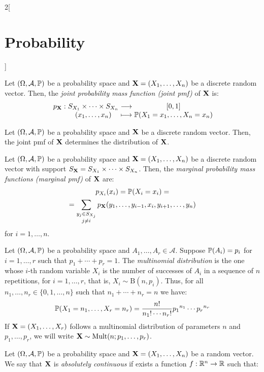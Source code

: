 \documentclass[../../../main.tex]{subfiles}
\begin{document}
\begin{multicols}{2}[\section{Probability}]
\begin{prop}
  \end{prop}
  \begin{definition}
    Let $(\Omega,\mathcal{A},\mathbb{P})$ be a probability space and $\boldsymbol{\mathrm{X}}=(X_1,\ldots,X_n)$ be a discrete random vector. Then, the \textit{joint probability mass function (joint pmf)} of $\boldsymbol{\mathrm{X}}$ is:
    $$
      \function{p_{\vf{X}}}{S_{X_1}\times\cdots\times S_{X_n}}{[0,1]}{(x_1,\ldots,x_n)}{\Prob(X_1=x_1,\ldots,X_n=x_n)}
    $$
  \end{definition}
  \begin{prop}
    Let $(\Omega,\mathcal{A},\mathbb{P})$ be a probability space and $\boldsymbol{\mathrm{X}}$ be a discrete random vector. Then, the joint pmf of $\boldsymbol{\mathrm{X}}$ determines the distribution of $\boldsymbol{\mathrm{X}}$.
  \end{prop}
  \begin{definition}
    Let $(\Omega,\mathcal{A},\mathbb{P})$ be a probability space and $\boldsymbol{\mathrm{X}}=(X_1,\ldots,X_n)$ be a discrete random vector with support $S_{\boldsymbol{\mathrm{X}}}=S_{X_1}\times\cdots\times S_{X_n}$. Then, the \textit{marginal probability mass functions (marginal pmf)} of $\boldsymbol{\mathrm{X}}$ are:
    \begin{multline*}
      p_{X_i}(x_i)=\mathbb{P}(X_i=x_i)=\\=\sum_{\substack{y_j\in S_{X_j}\\j\ne i}}p_{\boldsymbol{\mathrm{X}}}(y_1,\ldots,y_{i-1},x_i,y_{i+1},\ldots,y_n)
    \end{multline*}
    for $i=1,\ldots,n$.
  \end{definition}
  \begin{definition}
    Let $(\Omega,\mathcal{A},\mathbb{P})$ be a probability space and $A_1,\ldots,A_r\in\mathcal{A}$. Suppose $\mathbb{P}(A_i)=p_i$ for $i=1,\ldots,r$ such that $p_1+\cdots+p_r=1$. The \textit{multinomial distribution} is the one whose $i$-th random variable $X_i$ is the number of successes of $A_i$ in a sequence of $n$ repetitions, for $i=1,\ldots,r$, that is, $X_i\sim\text{B}(n,p_i)$. Thus, for all $n_1,\ldots,n_r\in\{0,1,\ldots,n\}$ such that $n_1+\cdots+n_r=n$ we have: $$\mathbb{P}(X_1=n_1,\ldots,X_r=n_r)=\frac{n!}{n_1!\cdots n_r!} {p_1}^{n_1}\cdots{p_r}^{n_r}$$ If $\boldsymbol{\mathrm{X}}=(X_1,\ldots,X_r)$ follows a multinomial distribution of parameters $n$ and $p_1,\ldots,p_r$, we will write $\boldsymbol{\mathrm{X}}\sim \text{Mult}(n;p_1,\ldots,p_r)$.
  \end{definition}
  \begin{definition}
    Let $(\Omega,\mathcal{A},\mathbb{P})$ be a probability space and $\boldsymbol{\mathrm{X}}=(X_1,\ldots,X_n)$ be a random vector. We say that $\boldsymbol{\mathrm{X}}$ is \textit{absolutely continuous} if exists a function $f:\mathbb{R}^n\rightarrow\mathbb{R}$ such that:

\end{definition}
\end{multicols}
\end{document}
